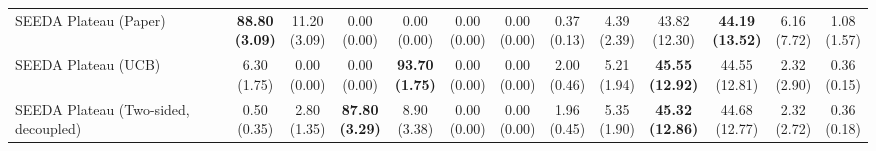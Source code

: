 \begin{table}[H]
{\begin{tabular}{l|cccccc|cccccc}
SEEDA Plateau (Paper) & \bfseries \makecell{88.80 \\ (3.09)} & \makecell{11.20 \\ (3.09)} & {\cellcolor[HTML]{C8E6C9}} \makecell{0.00 \\ (0.00)} & \makecell{0.00 \\ (0.00)} & \makecell{0.00 \\ (0.00)} & \makecell{0.00 \\ (0.00)} & \makecell{0.37 \\ (0.13)} & \makecell{4.39 \\ (2.39)} & {\cellcolor[HTML]{C8E6C9}} \makecell{43.82 \\ (12.30)} & \bfseries \makecell{44.19 \\ (13.52)} & \makecell{6.16 \\ (7.72)} & \makecell{1.08 \\ (1.57)} \\
SEEDA Plateau (UCB) & \makecell{6.30 \\ (1.75)} & \makecell{0.00 \\ (0.00)} & {\cellcolor[HTML]{C8E6C9}} \makecell{0.00 \\ (0.00)} & \bfseries \makecell{93.70 \\ (1.75)} & \makecell{0.00 \\ (0.00)} & \makecell{0.00 \\ (0.00)} & \makecell{2.00 \\ (0.46)} & \makecell{5.21 \\ (1.94)} & {\cellcolor[HTML]{C8E6C9}} \bfseries \makecell{45.55 \\ (12.92)} & \makecell{44.55 \\ (12.81)} & \makecell{2.32 \\ (2.90)} & \makecell{0.36 \\ (0.15)} \\
SEEDA Plateau (Two-sided, decoupled) & \makecell{0.50 \\ (0.35)} & \makecell{2.80 \\ (1.35)} & {\cellcolor[HTML]{C8E6C9}} \bfseries \makecell{87.80 \\ (3.29)} & \makecell{8.90 \\ (3.38)} & \makecell{0.00 \\ (0.00)} & \makecell{0.00 \\ (0.00)} & \makecell{1.96 \\ (0.45)} & \makecell{5.35 \\ (1.90)} & {\cellcolor[HTML]{C8E6C9}} \bfseries \makecell{45.32 \\ (12.86)} & \makecell{44.68 \\ (12.77)} & \makecell{2.32 \\ (2.72)} & \makecell{0.36 \\ (0.18)} \\

\end{tabular}}
\end{table}
